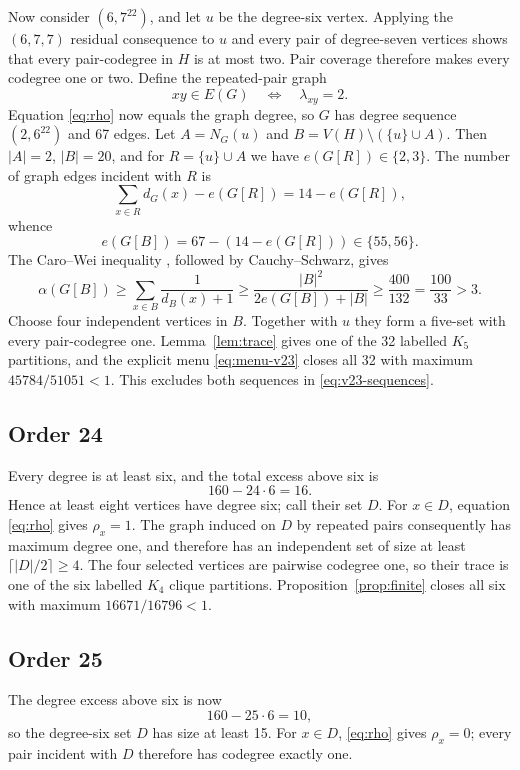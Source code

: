 \documentclass[11pt]{article}
\theoremstyle{remark}
\begin{document}
Now consider $(6,7^{22})$, and let $u$ be the degree-six vertex.  Applying
the $(6,7,7)$ residual consequence to $u$ and every pair of degree-seven
vertices shows that every pair-codegree in $H$ is at most two.  Pair coverage
therefore makes every codegree one or two.  Define the repeated-pair graph
\[
xy\in E(G)\quad\Longleftrightarrow\quad\lambda_{xy}=2.
\]
Equation \eqref{eq:rho} now equals the graph degree, so $G$ has degree
sequence $(2,6^{22})$ and 67 edges.  Let $A=N_G(u)$ and
$B=V(H)\setminus(\{u\}\cup A)$.  Then $|A|=2$, $|B|=20$, and for
$R=\{u\}\cup A$ we have $e(G[R])\in\{2,3\}$.  The number of graph edges
incident with $R$ is
\[
\sum_{x\in R}d_G(x)-e(G[R])=14-e(G[R]),
\]
whence
\[
e(G[B])=67-(14-e(G[R]))\in\{55,56\}.
\]
The Caro--Wei inequality \cite{Caro1979,Wei1981}, followed by
Cauchy--Schwarz, gives
\[
\alpha(G[B])\ge\sum_{x\in B}\frac1{d_B(x)+1}
\ge\frac{|B|^2}{2e(G[B])+|B|}
\ge\frac{400}{132}=\frac{100}{33}>3.
\]
Choose four independent vertices in $B$.  Together with $u$ they form a
five-set with every pair-codegree one.  Lemma~\ref{lem:trace} gives one of
the 32 labelled $K_5$ partitions, and the explicit menu
\eqref{eq:menu-v23} closes all 32 with maximum $45784/51051<1$.  This
excludes both sequences in \eqref{eq:v23-sequences}.

\subsection{Order 24}

Every degree is at least six, and the total excess above six is
\[
160-24\cdot6=16.
\]
Hence at least eight vertices have degree six; call their set $D$.  For
$x\in D$, equation \eqref{eq:rho} gives $\rho_x=1$.  The graph induced on
$D$ by repeated pairs consequently has maximum degree one, and therefore
has an independent set of size at least $\lceil|D|/2\rceil\ge4$.  The four
selected vertices are pairwise codegree one, so their trace is one of the
six labelled $K_4$ clique partitions.  Proposition~\ref{prop:finite} closes
all six with maximum $16671/16796<1$.

\subsection{Order 25}\label{subsec:v25}

The degree excess above six is now
\[
160-25\cdot6=10,
\]
so the degree-six set $D$ has size at least 15.  For $x\in D$,
\eqref{eq:rho} gives $\rho_x=0$; every pair incident with $D$ therefore has
codegree exactly one.
\end{document}
